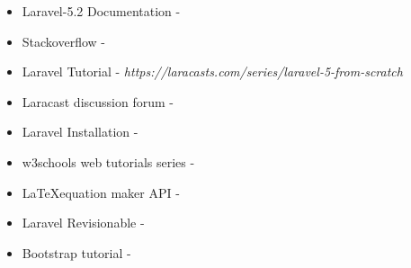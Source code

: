 \documentclass[a4paper,12pt,oneside]{book}
\begin{document}
\begin{thebibliography}{li}
    \begin{itemize}
        \item Laravel-5.2 Documentation - 
        \item Stackoverflow - 
        \item Laravel Tutorial - \textit{https://laracasts.com/series/laravel-5-from-scratch} 
        \item Laracast discussion forum - 
        \item Laravel Installation - 
        \item w3schools web tutorials series - 
        \item \LaTeX equation maker API - 
        \item Laravel Revisionable - 
        \item Bootstrap tutorial - 
    \end{itemize}
\end{thebibliography}
\end{document}
